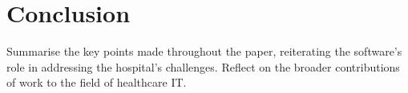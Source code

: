\documentclass[11pt]{article}
\begin{document}
\section{Conclusion}
Summarise the key points made throughout the paper, reiterating the software's role in addressing the hospital's challenges.
Reflect on the broader contributions of work to the field of healthcare IT.

\begin{thebibliography}{}
\end{thebibliography}
\end{document}
